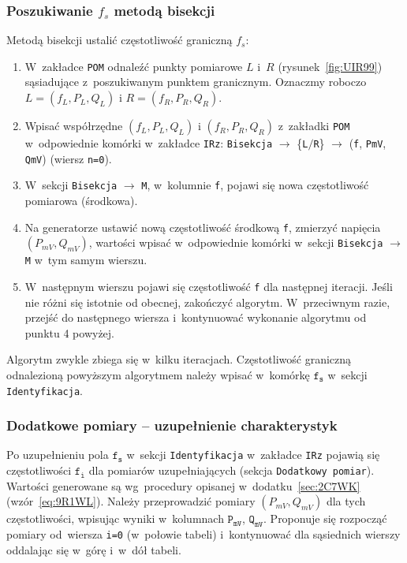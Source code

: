 \documentclass[paper=a4,DIV=12]{lpas}
\begin{document}
\subsubsection{Poszukiwanie $f_s$ metodą bisekcji}
\label{sec:WM5KT}

Metodą bisekcji ustalić częstotliwość graniczną $f_s$:
\begin{enumerate}
  \item W~zakładce \texttt{POM} odnaleźć punkty pomiarowe $L$ i~$R$
    (rysunek~\ref{fig:UIR99}) sąsiadujące z~poszukiwanym punktem granicznym.
    Oznaczmy roboczo $L = (f_L, P_L, Q_L)$ i $R = (f_R, P_R, Q_R)$.
  \item Wpisać współrzędne $(f_L, P_L, Q_L)$ i $(f_R, P_R, Q_R)$ z~zakładki
    \texttt{POM} w~odpowiednie komórki w~zakładce \texttt{IRz}:
    \texttt{Bisekcja} $\rightarrow$ \{\texttt{L}$/$\texttt{R}\} $\rightarrow$
    (\texttt{f}, \texttt{PmV}, \texttt{QmV})  (wiersz \texttt{n=0}).
  \item W~sekcji \texttt{Bisekcja} $\rightarrow$ \texttt{M}, w~kolumnie
    \texttt{f}, pojawi się nowa częstotliwość pomiarowa (środkowa).
  \item Na generatorze ustawić nową częstotliwość środkową \texttt{f}, zmierzyć
    napięcia $(P_{mV}, Q_{mV})$, wartości wpisać w~odpowiednie komórki w~sekcji
    \texttt{Bisekcja} $\rightarrow$ \texttt{M} w~tym samym wierszu.
  \item W~następnym wierszu pojawi się częstotliwość \texttt{f} dla następnej
    iteracji. Jeśli nie różni się istotnie od obecnej, zakończyć algorytm.
    W~przeciwnym razie, przejść do następnego wiersza i~kontynuować wykonanie
    algorytmu od punktu 4 powyżej.
\end{enumerate}

Algorytm zwykle zbiega się w~kilku iteracjach. Częstotliwość graniczną
odnalezioną powyższym algorytmem należy wpisać w~komórkę $\texttt{f}_\texttt{s}$ w~sekcji
\texttt{Identyfikacja}.

\subsubsection{Dodatkowe pomiary -- uzupełnienie charakterystyk}
\label{sec:09H54}

Po uzupełnieniu pola $\texttt{f}_\texttt{s}$ w~sekcji \texttt{Identyfikacja}
w~zakładce \texttt{IRz} pojawią się częstotliwości $\texttt{f}_\texttt{i}$
dla pomiarów uzupełniających (sekcja \texttt{Dodatkowy pomiar}). Wartości
generowane są wg~procedury opisanej w~dodatku~\ref{sec:2C7WK}
(wzór~\eqref{eq:9R1WL}). Należy przeprowadzić pomiary $(P_{mV}, Q_{mV})$ dla
tych częstotliwości, wpisując wyniki w~kolumnach $\texttt{P}_\texttt{mV}$,
$\texttt{Q}_\texttt{mV}$. Proponuje się rozpocząć pomiary od~wiersza
\texttt{i=0} (w~połowie tabeli) i~kontynuować dla sąsiednich wierszy oddalając
się w~górę i~w~dół tabeli.
\end{document}
